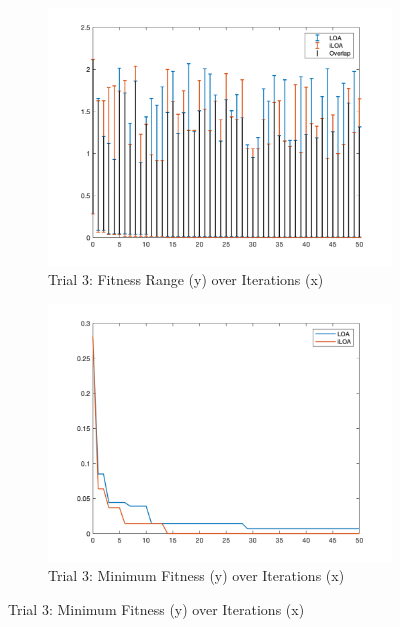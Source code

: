 \begin{figure}
  \begin{subfigure}[b]{0.4\textwidth}
    \includegraphics[width=\textwidth]{img/bars/f5/3}
    \caption{ \scriptsize Trial 3: Fitness Range (y) over Iterations (x)}
    \label{fig:f5-b-3}
  \end{subfigure}
  \begin{subfigure}[b]{0.4\textwidth}
    \includegraphics[width=\textwidth]{img/fits/f5/3}
    \caption{ \scriptsize Trial 3: Minimum Fitness (y) over Iterations (x)}
    \label{fig:f5-f-3}
  \end{subfigure}


\end{figure}
